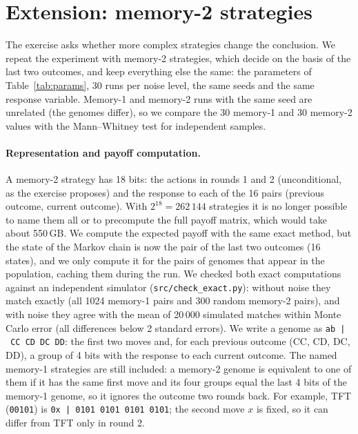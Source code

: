 \documentclass[10pt,a4paper]{article}
\newcommand{\g}[1]{\texttt{#1}}   %
\begin{document}
\section{Extension: memory-2 strategies}\label{sec:m2}
The exercise asks whether more complex strategies change the conclusion. We repeat the experiment with
memory-2 strategies, which decide on the basis of the last two outcomes, and keep everything else the same:
the parameters of Table~\ref{tab:params}, 30 runs per noise level, the same seeds and the same response
variable. Memory-1 and memory-2 runs with the same seed are unrelated (the genomes differ), so we compare the 30 memory-1 and
30 memory-2 values with the Mann--Whitney test for independent samples.

\paragraph{Representation and payoff computation.} A memory-2 strategy has 18 bits: the actions in rounds
1 and 2 (unconditional, as the exercise proposes) and the response to each of the 16 pairs (previous
outcome, current outcome). With $2^{18}=262\,144$ strategies it is no longer possible to name them all or to
precompute the full payoff matrix, which would take about 550\,GB. We compute the expected payoff with the
same exact method, but the state of the Markov chain is now the pair of the last two outcomes (16 states),
and we only compute it for the pairs of genomes that appear in the population, caching them during the
run. We checked both exact computations against an independent simulator
(\texttt{src/check\_exact.py}): without noise they match exactly (all 1024 memory-1 pairs and 300 random
memory-2 pairs), and with noise they agree with the mean of 20\,000 simulated matches within Monte Carlo
error (all differences below 2 standard errors).
We write a genome as \g{ab~|~CC~CD~DC~DD}: the first two moves and, for each previous outcome (CC, CD,
DC, DD), a group of 4 bits with the response to each current outcome.
The named memory-1 strategies are still included: a memory-2 genome is equivalent to one of them if it has
the same first move and its four groups equal the last 4 bits of the memory-1 genome, so it ignores the
outcome two rounds back. For example, TFT (\g{00101}) is \g{0x\,|\,0101\,0101\,0101\,0101}; the second
move $x$ is fixed, so it can differ from TFT only in round 2.
\end{document}
